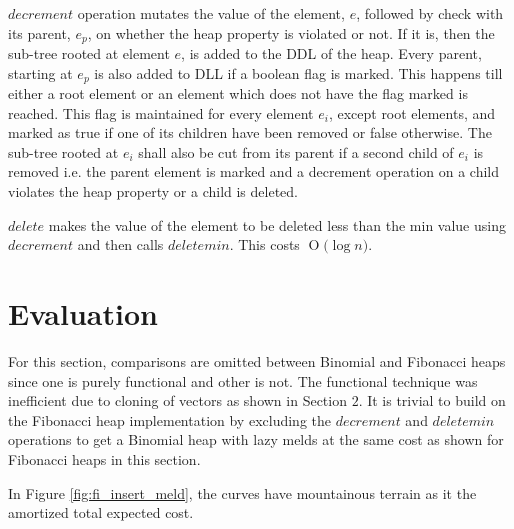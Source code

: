 \documentclass{llncs}
\newcommand{\BigO}[1]{\ensuremath{\operatorname{O}\bigl(#1\bigr)}}
\begin{document}
$decrement$ operation mutates the value of the element, $e$, followed by check with its parent, $e_p$, on whether the heap property is violated or not. If it is, then the sub-tree rooted at element $e$, is added to the DDL of the heap. Every parent, starting at $e_p$ is also added to DLL if a boolean flag is marked. This happens till either a root element or an element which does not have the flag marked is reached. This flag is maintained for every element $e_i$, except root elements, and marked as true if one of its children have been removed or false otherwise. The sub-tree rooted at $e_i$ shall also be cut from its parent if a second child of $e_i$ is removed i.e. the parent element is marked and a decrement operation on a child violates the heap property or a child is deleted.

$delete$ makes the value of the element to be deleted less than the min value using $decrement$ and then calls $deletemin$. This costs \BigO{\log n}.


\section{Evaluation}
For this section, comparisons are omitted between Binomial and Fibonacci heaps since one is purely functional and other is not. The functional technique was inefficient due to cloning of vectors as shown in Section $2$. It is trivial to build on the Fibonacci heap implementation by excluding the $decrement$ and $deletemin$ operations to get a Binomial heap with lazy melds\cite{kozen1992design} at the same cost as shown for Fibonacci heaps in this section. 

In Figure \ref{fig:fi_insert_meld}, the curves have mountainous terrain as it the amortized total expected cost.
\end{document}
